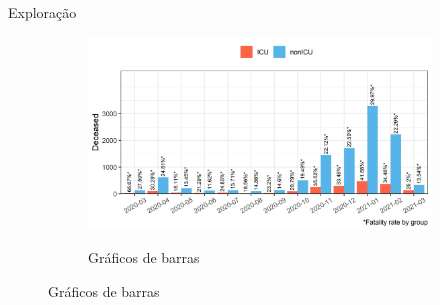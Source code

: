 \documentclass[pdf]
{beamer}
\begin{document}
\begin{frame}{Exploração}
\begin{figure}
\begin{subfigure}[][40pt][t]{0.3\textwidth}
		\caption*{Gráficos de barras}
		\vspace{-0.4cm}
   		 \includegraphics[width=\textwidth]{Imagens/histPlot_Discharge_month_Type_Death.jpeg}\\
	\end{subfigure}
\end{figure}
\end{frame}
\end{document}
